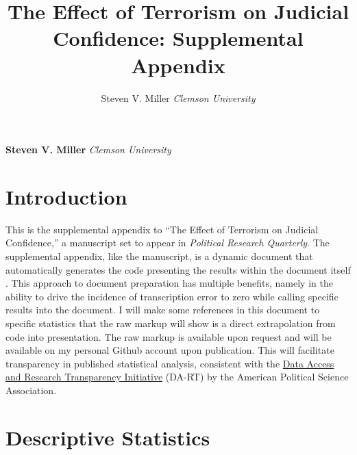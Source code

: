 \documentclass[11pt,]{article}
\title{The Effect of Terrorism on Judicial Confidence: Supplemental Appendix  }
\author{\Large Steven V. Miller\vspace{0.05in} \newline\normalsize\emph{Clemson University}  }
\date{}
\newcommand*{\authorfont}{\fontfamily{phv}\selectfont}
\begin{document}
	
%

{%
\setlength{\parindent}{0pt}
\thispagestyle{plain}
{\fontsize{18}{20}\selectfont\raggedright 
\maketitle  %

}

{
   \vskip 13.5pt\relax \normalsize\fontsize{11}{12} 
\textbf{\authorfont Steven V. Miller} \hskip 15pt \emph{\small Clemson University}   

}

}



{
\hypersetup{linkcolor=black}
\setcounter{tocdepth}{2}
\tableofcontents
}


\vskip 6.5pt

\noindent  \newpage 

\section{Introduction}\label{introduction}

This is the supplemental appendix to ``The Effect of Terrorism on
Judicial Confidence,'' a manuscript set to appear in \emph{Political
Research Quarterly}. The supplemental appendix, like the manuscript, is
a dynamic document that automatically generates the code presenting the
results within the document itself \citep{xie2013ddrk}. This approach to
document preparation has multiple benefits, namely in the ability to
drive the incidence of transcription error to zero while calling
specific results into the document. I will make some references in this
document to specific statistics that the raw markup will show is a
direct extrapolation from code into presentation. The raw markup is
available upon request and will be available on my personal Github
account upon publication. This will facilitate transparency in published
statistical analysis, consistent with the
\href{http://www.dartstatement.org/}{Data Access and Research
Transparency Initiative} (DA-RT) by the American Political Science
Association.

\section{Descriptive Statistics}\label{descriptive-statistics}
\end{document}
